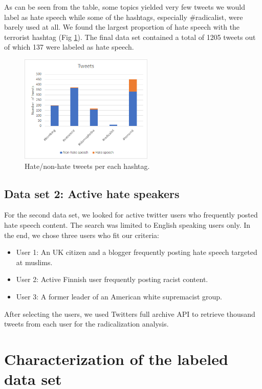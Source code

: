 \documentclass[conference]{IEEEtran}
\begin{document}
As can be seen from the table, some topics yielded very few tweets we would label as hate speech 
while some of the hashtags, especially \#radicalist, were barely used at all. We found the largest
proportion of hate speech with the terrorist hashtag (Fig \ref{fig:data_set_1_summary}). The final 
data set contained a total of 1205 tweets out of which 137 were labeled as hate speech. 

\begin{figure}[htbp]
\centering
\centerline{\includegraphics[width=2.5in]{data_set_1_summary.png}}
\caption{Hate/non-hate tweets per each hashtag.}
\label{fig:data_set_1_summary}
\end{figure}

\subsection{Data set 2: Active hate speakers}
For the second data set, we looked for active twitter users who frequently posted hate speech content. 
The search was limited to English speaking users only. In the end, we chose three users who fit our 
criteria: 
\begin{itemize}
    \item User 1: An UK citizen and a blogger frequently posting hate speech targeted at muslims.
    \item User 2: Active Finnish user frequently posting racist content.
    \item User 3: A former leader of an American white supremacist group.
\end{itemize}
After selecting the users, we used Twitters full archive API to retrieve thousand tweets from each user for the
radicalization analysis. 
\section{Characterization of the labeled data set}
\end{document}
